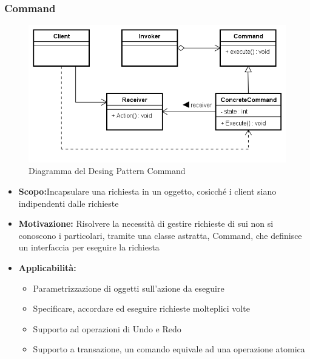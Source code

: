 \documentclass[a4paper]{article}
\begin{document}
	\subsubsection{Command}
				\begin{figure}[H]
					\centering
					\includegraphics[scale=0.65]{immagini/ST/schemaCommand.png}
					\caption{Diagramma del Desing Pattern Command}
				\end{figure}
            \begin{itemize}
				\item \textbf{Scopo:}Incapsulare una richiesta in un oggetto, cosicché i client siano indipendenti dalle richieste 
                \item \textbf{Motivazione:}
                Risolvere la necessità di gestire richieste di sui non si conoscono i particolari, tramite una classe astratta, Command, che definisce un interfaccia per eseguire la richiesta
                \item \textbf{Applicabilità:}
					\begin{itemize}
						\item Parametrizzazione di oggetti sull'azione da eseguire
						\item Specificare, accordare ed eseguire richieste molteplici volte
						\item Supporto ad operazioni di Undo e Redo
						\item Supporto a transazione, un comando equivale ad una operazione atomica
					\end{itemize}		
			\end{itemize}
				
\end{document}
